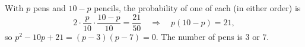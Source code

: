 With $p$ pens and $10-p$ pencils, the probability of one of each (in either order) is
\[2\cdot\dfrac p{10}\cdot\dfrac{10-p}{10}=\dfrac{21}{50}\quad\Longrightarrow\quad p(10-p)=21,\]
so $p^2-10p+21=(p-3)(p-7)=0$. The number of pens is $\boxed{3\text{ or }7}$.
